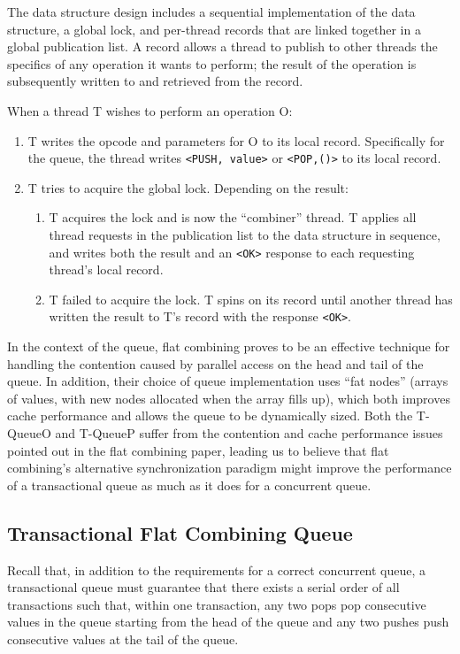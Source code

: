 The data structure design includes a sequential implementation of the data structure, a global lock, and per-thread records that are linked together in a global publication list. A record allows a thread to publish to other threads the specifics of any operation it wants to perform; the result of the operation is subsequently written to and retrieved from the record.

When a thread T wishes to perform an operation O:
\begin{enumerate}
    \item T writes the opcode and parameters for O to its local record. Specifically for the queue, the thread writes \texttt{<PUSH, value>} or \texttt{<POP,()>} to its local record.
   \item T tries to acquire the global lock. Depending on the result:
   \begin{enumerate}
        \item T acquires the lock and is now the “combiner” thread. T applies all thread requests in the publication list to the data structure in sequence, and writes both the result and an \texttt{<OK>} response to each requesting thread's local record.
        \item T failed to acquire the lock. T spins on its record until another thread has written the result to T's record with the response \texttt{<OK>}.
    \end{enumerate}
\end{enumerate}

In the context of the queue, flat combining proves to be an effective technique for handling the contention caused by parallel access on the head and tail of the queue. In addition, their choice of queue implementation uses ``fat nodes'' (arrays of values, with new nodes allocated when the array fills up), which both improves cache performance and allows the queue to be dynamically sized. Both the T-QueueO and T-QueueP suffer from the contention and cache performance issues pointed out in the flat combining paper, leading us to believe that flat combining's alternative synchronization paradigm might improve the performance of a transactional queue as much as it does for a concurrent queue.

\subsection{Transactional Flat Combining Queue} 
\label{fcqueuet}

Recall that, in addition to the requirements for a correct concurrent queue, a transactional queue must guarantee that there exists a serial order of all transactions such that, within one transaction, any two pops pop consecutive values in the queue starting from the head of the queue and any two pushes push consecutive values at the tail of the queue.

